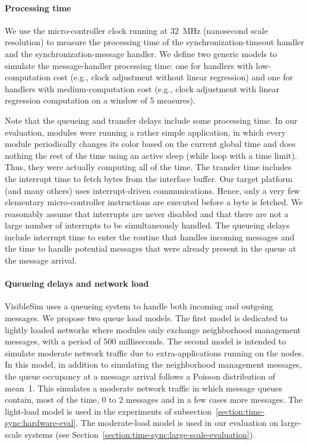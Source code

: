 \paragraph{Processing time}
We use the micro-controller clock running at 32~MHz (nanosecond scale resolution) to measure the processing time of the synchronization-timeout handler and the synchronization-message handler. We define two generic models to simulate the message-handler processing time: one for handlers with low-computation cost (e.g., clock adjustment without linear regression) and one for handlers with medium-computation cost (e.g., clock adjustment with linear regression computation on a window of 5 measures).

Note that the queueing and transfer delays include some processing time. In our evaluation, modules were running a rather simple application, in which every module periodically changes its color based on the current global time and does nothing the rest of the time using an active sleep (while loop with a time limit). Thus, they were actually computing all of the time.  The transfer time includes the interrupt time to fetch bytes from the interface buffer. Our target platform (and many others) uses interrupt-driven communications. Hence, only a very few elementary micro-controller instructions are executed before a byte is fetched. We reasonably assume that interrupts are never disabled and that there are not a large number of interrupts to be simultaneously handled. The queueing delays include interrupt time to enter the routine that handles incoming messages and the time to handle potential messages that were already present in the queue at the message arrival.

\paragraph{Queueing delays and network load}
VisibleSim uses a queueing system to handle both incoming and outgoing messages. We propose two queue load models. The first model is dedicated to lightly loaded networks where modules only exchange neighborhood management messages, with a period of 500 milliseconds. The second model is intended to simulate moderate network traffic due to extra-applications running on the nodes. In this model, in addition to simulating the neighborhood management messages, the queue occupancy at a message arrival follows a Poisson distribution of mean~1. This simulates a moderate network traffic in which message queues contain, most of the time, 0 to 2 messages and in a few cases more messages. The light-load model is used in the experiments of subsection~\ref{section:time-sync:hardware-eval}. The moderate-load model is used in our evaluation on large-scale systems (see Section~\ref{section:time-sync:large-scale-evaluation}).

